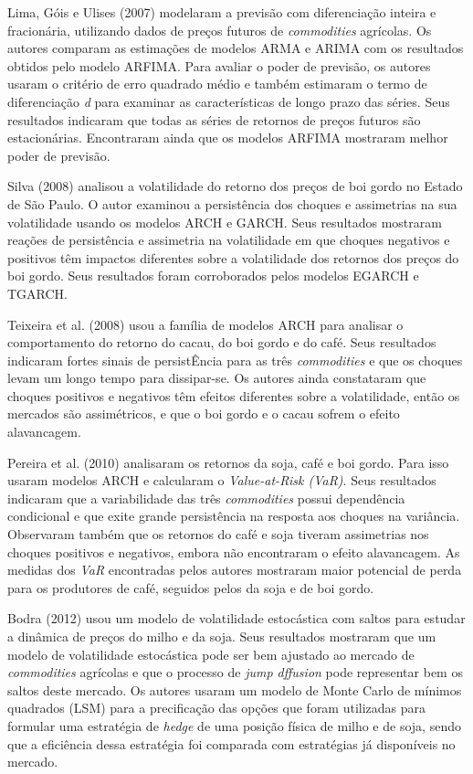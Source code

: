 \documentclass[]{article}
\begin{document}
Lima, Góis e Ulises (2007) modelaram a previsão com diferenciação
inteira e fracionária, utilizando dados de preços futuros de
\emph{commodities} agrícolas. Os autores comparam as estimações de
modelos ARMA e ARIMA com os resultados obtidos pelo modelo ARFIMA. Para
avaliar o poder de previsão, os autores usaram o critério de erro
quadrado médio e também estimaram o termo de diferenciação \emph{d} para
examinar as características de longo prazo das séries. Seus resultados
indicaram que todas as séries de retornos de preços futuros são
estacionárias. Encontraram ainda que os modelos ARFIMA mostraram melhor
poder de previsão.

Silva (2008) analisou a volatilidade do retorno dos preços de boi gordo
no Estado de São Paulo. O autor examinou a persistência dos choques e
assimetrias na sua volatilidade usando os modelos ARCH e GARCH. Seus
resultados mostraram reações de persistência e assimetria na
volatilidade em que choques negativos e positivos têm impactos
diferentes sobre a volatilidade dos retornos dos preços do boi gordo.
Seus resultados foram corroborados pelos modelos EGARCH e TGARCH.

Teixeira et al. (2008) usou a família de modelos ARCH para analisar o
comportamento do retorno do cacau, do boi gordo e do café. Seus
resultados indicaram fortes sinais de persistÊncia para as três
\emph{commodities} e que os choques levam um longo tempo para
dissipar-se. Os autores ainda constataram que choques positivos e
negativos têm efeitos diferentes sobre a volatilidade, então os mercados
são assimétricos, e que o boi gordo e o cacau sofrem o efeito
alavancagem.

Pereira et al. (2010) analisaram os retornos da soja, café e boi gordo.
Para isso usaram modelos ARCH e calcularam o \emph{Value-at-Risk (VaR)}.
Seus resultados indicaram que a variabilidade das três
\emph{commodities} possui dependência condicional e que exite grande
persistência na resposta aos choques na variância. Observaram também que
os retornos do café e soja tiveram assimetrias nos choques positivos e
negativos, embora não encontraram o efeito alavancagem. As medidas dos
\emph{VaR} encontradas pelos autores mostraram maior potencial de perda
para os produtores de café, seguidos pelos da soja e de boi gordo.

Bodra (2012) usou um modelo de volatilidade estocástica com saltos para
estudar a dinâmica de preços do milho e da soja. Seus resultados
mostraram que um modelo de volatilidade estocástica pode ser bem
ajustado ao mercado de \emph{commodities} agrícolas e que o processo de
\emph{jump dffusion} pode representar bem os saltos deste mercado. Os
autores usaram um modelo de Monte Carlo de mínimos quadrados (LSM) para
a precificação das opções que foram utilizadas para formular uma
estratégia de \emph{hedge} de uma posição física de milho e de soja,
sendo que a eficiência dessa estratégia foi comparada com estratégias já
disponíveis no mercado.
\end{document}
